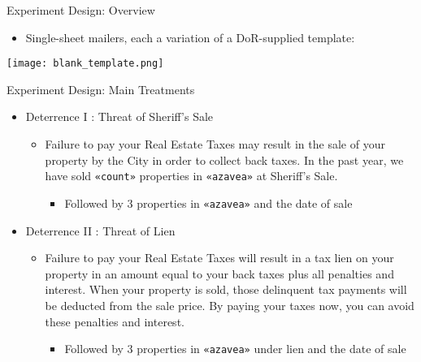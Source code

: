 \documentclass[ignorenonframetext,]{beamer}
\providecommand{\tightlist}{%
  \setlength{\itemsep}{0pt}\setlength{\parskip}{0pt}}
\begin{document}
\begin{frame}{Experiment Design: Overview}

\begin{itemize}
\tightlist
\item
  Single-sheet mailers, each a variation of a DoR-supplied template:
\end{itemize}

\begin{center}
\texttt{[image: blank\_template.png]}
\end{center}

\end{frame}

\begin{frame}[fragile]{Experiment Design: Main Treatments}

\begin{itemize}
\item
  Deterrence I : Threat of Sheriff's Sale

  \begin{itemize}
  \item
    Failure to pay your Real Estate Taxes may result in the sale of your
    property by the City in order to collect back taxes. In the past
    year, we have sold \texttt{«count»} properties in \texttt{«azavea»}
    at Sheriff's Sale.

    \begin{itemize}
    \tightlist
    \item
      Followed by 3 properties in \texttt{«azavea»} and the date of sale
    \end{itemize}
  \end{itemize}
\item
  Deterrence II : Threat of Lien

  \begin{itemize}
  \item
    Failure to pay your Real Estate Taxes will result in a tax lien on
    your property in an amount equal to your back taxes plus all
    penalties and interest. When your property is sold, those delinquent
    tax payments will be deducted from the sale price. By paying your
    taxes now, you can avoid these penalties and interest.

    \begin{itemize}
    \tightlist
    \item
      Followed by 3 properties in \texttt{«azavea»} under lien and the
      date of sale
    \end{itemize}
  \end{itemize}
\end{itemize}

\end{frame}
\end{document}
